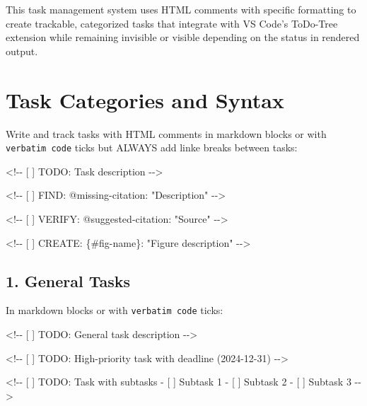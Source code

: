 \documentclass[
  11pt,
  letterpaper,
]{book}
\newenvironment{Shaded}{\begin{snugshade}}{\end{snugshade}}
\newcommand{\AlertTok}[1]{\textcolor[rgb]{0.68,0.00,0.00}{#1}}
\newcommand{\CommentTok}[1]{\textcolor[rgb]{0.37,0.37,0.37}{#1}}
\newcommand{\InformationTok}[1]{\textcolor[rgb]{0.37,0.37,0.37}{#1}}
\begin{document}
This task management system uses HTML comments with specific formatting
to create trackable, categorized tasks that integrate with VS Code's
ToDo-Tree extension while remaining invisible or visible depending on
the status in rendered output.

\section*{Task Categories and Syntax}\label{task-categories-and-syntax}


Write and track tasks with HTML comments in markdown blocks or with
\texttt{verbatim\ code} ticks but ALWAYS add linke breaks between tasks:

\begin{Shaded}
\begin{Highlighting}[]
\InformationTok{\textasciigrave{}\textless{}!{-}{-} [ ] TODO: Task description {-}{-}\textgreater{}\textasciigrave{}}

\InformationTok{\textasciigrave{}\textless{}!{-}{-} [ ] FIND: @missing{-}citation: "Description" {-}{-}\textgreater{}\textasciigrave{}}

\InformationTok{\textasciigrave{}\textless{}!{-}{-} [ ] VERIFY: @suggested{-}citation: "Source" {-}{-}\textgreater{}\textasciigrave{}}

\InformationTok{\textasciigrave{}\textless{}!{-}{-} [ ] CREATE: \{\#fig{-}name\}: "Figure description" {-}{-}\textgreater{}\textasciigrave{}}
\end{Highlighting}
\end{Shaded}

\subsection*{1. General Tasks}\label{general-tasks}

In markdown blocks or with \texttt{verbatim\ code} ticks:

\begin{Shaded}
\begin{Highlighting}[]
\CommentTok{\textless{}!{-}{-} [ ] }\AlertTok{TODO}\CommentTok{: General task description {-}{-}\textgreater{}}

\CommentTok{\textless{}!{-}{-} [ ] }\AlertTok{TODO}\CommentTok{: High{-}priority task with deadline (2024{-}12{-}31) {-}{-}\textgreater{}}


\CommentTok{\textless{}!{-}{-} [ ] }\AlertTok{TODO}\CommentTok{: Task with subtasks}
\CommentTok{        {-} [ ] Subtask 1}
\CommentTok{        {-} [ ] Subtask 2}
\CommentTok{        {-} [ ] Subtask 3}
\CommentTok{{-}{-}\textgreater{}}
\end{Highlighting}
\end{Shaded}
\end{document}
